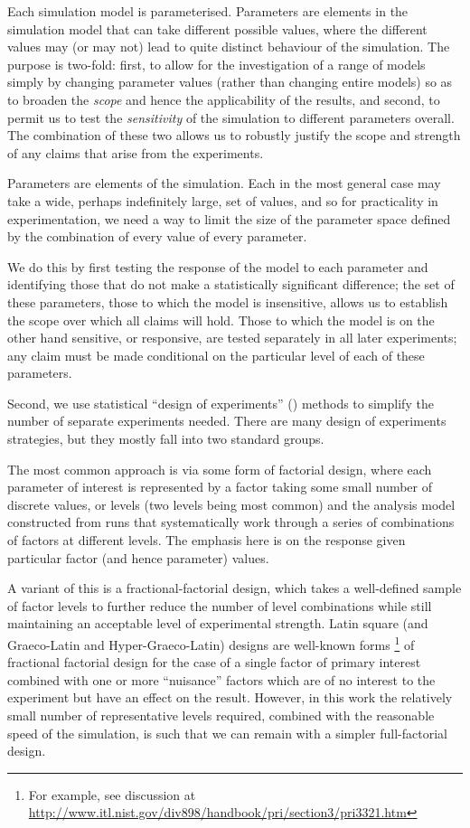 Each simulation model is parameterised. Parameters are elements in the simulation model that can take different possible values, where the different values may (or may not) lead to quite distinct behaviour of the simulation. The purpose is two-fold: first, to allow for the investigation of a range of models simply by changing parameter values (rather than changing entire models) so as to broaden the \emph{scope} and hence the applicability of the results, and second, to permit us to test the \emph{sensitivity} of the simulation to different parameters overall. The combination of these two allows us to robustly justify the scope and strength of any claims that arise from the experiments.

Parameters are elements of the simulation. Each in the most general case may take a wide, perhaps indefinitely large, set of values, and so for practicality in experimentation, we need a way to limit the size of the parameter space defined by the combination of every value of every parameter. 

We do this by first testing the response of the model to each parameter and identifying those that do not make a statistically significant difference; the set of these parameters, those to which the model is insensitive, allows us to establish the scope over which all claims will hold. Those to which the model is on the other hand sensitive, or responsive, are tested separately in all later experiments; any claim must be made conditional on the particular level of each of these parameters.

Second, we use statistical ``design of experiments'' (\eg \cite{Montgomery2009}) methods to simplify the number of separate experiments needed. There are many design of experiments strategies, but they mostly fall into two standard groups. 

The most common approach is via some form of factorial design, where each parameter of interest is represented by a factor taking some small number of discrete values, or levels (two levels being most common) and the analysis model constructed from runs that systematically work through a series of combinations of factors at different levels. The emphasis here is on the response given particular factor (and hence parameter) values. 

A variant of this is a fractional-factorial design, which takes a well-defined sample of factor levels to further reduce the number of level combinations while still maintaining an acceptable level of experimental strength. Latin square (and Graeco-Latin and Hyper-Graeco-Latin) designs are well-known forms \footnote{For example, see discussion at \url{http://www.itl.nist.gov/div898/handbook/pri/section3/pri3321.htm}} of fractional factorial design for the case of a single factor of primary interest combined with one or more ``nuisance'' factors which are of no interest to the experiment but have an effect on the result. However, in this work the relatively small number of representative levels required, combined with the reasonable speed of the simulation, is such that we can remain with a simpler full-factorial design.


